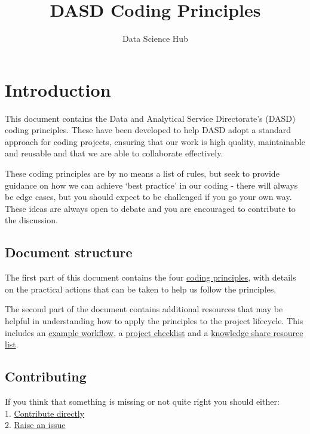 \documentclass[]{book}
\title{DASD Coding Principles}
\author{Data Science Hub}
\date{}
\begin{document}
\maketitle

{
\setcounter{tocdepth}{1}
\tableofcontents
}
\hypertarget{intro}{%
\chapter*{Introduction}\label{intro}}

This document contains the Data and Analytical Service Directorate's (DASD) coding principles. These have been developed to help DASD adopt a standard approach for coding projects, ensuring that our work is high quality, maintainable and reusable and that we are able to collaborate effectively.

These coding principles are by no means a list of rules, but seek to provide guidance on how we can achieve `best practice' in our coding - there will always be edge cases, but you should expect to be challenged if you go your own way. These ideas are always open to debate and you are encouraged to contribute to the discussion.

\hypertarget{structure}{%
\section*{Document structure}\label{structure}}

The first part of this document contains the four \protect\hyperlink{principles}{coding principles}, with details on the practical actions that can be taken to help us follow the principles.

The second part of the document contains additional resources that may be helpful in understanding how to apply the principles to the project lifecycle. This includes an \protect\hyperlink{wf}{example workflow}, a \protect\hyperlink{checklist}{project checklist} and a \protect\hyperlink{ksresources}{knowledge share resource list}.

\hypertarget{contributing}{%
\section*{Contributing}\label{contributing}}

If you think that something is missing or not quite right you should either:\\
1. \protect\hyperlink{versioncontrol}{Contribute directly}\\
2. \href{https://github.com/moj-analytical-services/our-coding-standards/issues}{Raise an issue}
\end{document}
